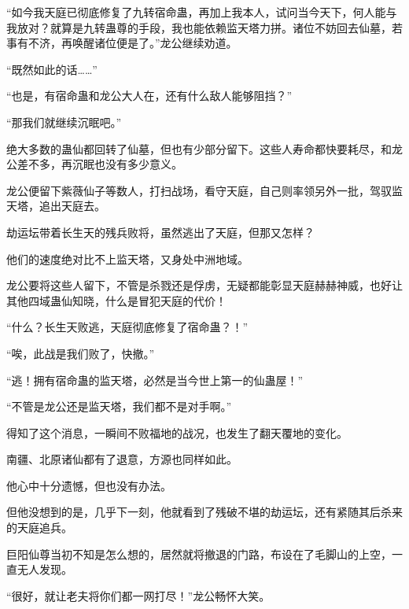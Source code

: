 \begin{this_body}
“如今我天庭已彻底修复了九转宿命蛊，再加上我本人，试问当今天下，何人能与我放对？就算是九转蛊尊的手段，我也能依赖监天塔力拼。诸位不妨回去仙墓，若事有不济，再唤醒诸位便是了。”龙公继续劝道。

“既然如此的话……”

“也是，有宿命蛊和龙公大人在，还有什么敌人能够阻挡？”

“那我们就继续沉眠吧。”

绝大多数的蛊仙都回转了仙墓，但也有少部分留下。这些人寿命都快要耗尽，和龙公差不多，再沉眠也没有多少意义。

龙公便留下紫薇仙子等数人，打扫战场，看守天庭，自己则率领另外一批，驾驭监天塔，追出天庭去。

劫运坛带着长生天的残兵败将，虽然逃出了天庭，但那又怎样？

他们的速度绝对比不上监天塔，又身处中洲地域。

龙公要将这些人留下，不管是杀戮还是俘虏，无疑都能彰显天庭赫赫神威，也好让其他四域蛊仙知晓，什么是冒犯天庭的代价！

“什么？长生天败逃，天庭彻底修复了宿命蛊？！”

“唉，此战是我们败了，快撤。”

“逃！拥有宿命蛊的监天塔，必然是当今世上第一的仙蛊屋！”

“不管是龙公还是监天塔，我们都不是对手啊。”

得知了这个消息，一瞬间不败福地的战况，也发生了翻天覆地的变化。

南疆、北原诸仙都有了退意，方源也同样如此。

他心中十分遗憾，但也没有办法。

但他没想到的是，几乎下一刻，他就看到了残破不堪的劫运坛，还有紧随其后杀来的天庭追兵。

巨阳仙尊当初不知是怎么想的，居然就将撤退的门路，布设在了毛脚山的上空，一直无人发现。

“很好，就让老夫将你们都一网打尽！”龙公畅怀大笑。

\end{this_body}

